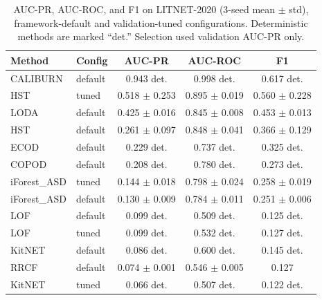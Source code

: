 \begin{table}[t]
\centering
\small
\begin{tabular}{llccc}
\toprule
Method & Config & AUC-PR & AUC-ROC & F1 \\
\midrule
CALIBURN & default & 0.943 det. & 0.998 det. & 0.617 det. \\
HST & tuned & 0.518 $\pm$ 0.253 & 0.895 $\pm$ 0.019 & 0.560 $\pm$ 0.228 \\
LODA & default & 0.425 $\pm$ 0.016 & 0.845 $\pm$ 0.008 & 0.453 $\pm$ 0.013 \\
HST & default & 0.261 $\pm$ 0.097 & 0.848 $\pm$ 0.041 & 0.366 $\pm$ 0.129 \\
ECOD & default & 0.229 det. & 0.737 det. & 0.325 det. \\
COPOD & default & 0.208 det. & 0.780 det. & 0.273 det. \\
iForest\_ASD & tuned & 0.144 $\pm$ 0.018 & 0.798 $\pm$ 0.024 & 0.258 $\pm$ 0.019 \\
iForest\_ASD & default & 0.130 $\pm$ 0.009 & 0.784 $\pm$ 0.011 & 0.251 $\pm$ 0.006 \\
LOF & default & 0.099 det. & 0.509 det. & 0.125 det. \\
LOF & tuned & 0.099 det. & 0.532 det. & 0.127 det. \\
KitNET & default & 0.086 det. & 0.600 det. & 0.145 det. \\
RRCF & default & 0.074 $\pm$ 0.001 & 0.546 $\pm$ 0.005 & 0.127 \\
KitNET & tuned & 0.066 det. & 0.507 det. & 0.122 det. \\
\bottomrule
\end{tabular}
\caption{AUC-PR, AUC-ROC, and F1 on LITNET-2020 (3-seed mean $\pm$ std), framework-default and validation-tuned configurations. Deterministic methods are marked ``det.'' Selection used validation AUC-PR only.}
\label{tab:litnet-tuned}
\end{table}
